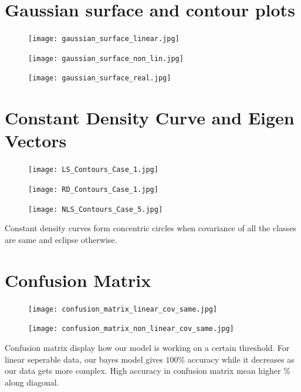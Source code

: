\documentclass[12pt]{article}
\begin{document}
 	\section{Gaussian surface and contour plots}
	\begin{figure}[H]
			\begin{minipage}{0.97\textwidth}
				\centering
				\texttt{[image: gaussian\_surface\_linear.jpg]}
			\end{minipage}\hfill
			\begin{minipage}{0.97\textwidth}
				\centering
				\texttt{[image: gaussian\_surface\_non\_lin.jpg]}
			\end{minipage}
			\begin{minipage}{0.97\textwidth}
				\centering
				\texttt{[image: gaussian\_surface\_real.jpg]}
			\end{minipage}
	\end{figure}\newpage

	\section{Constant Density Curve and Eigen Vectors}
	\begin{figure}[H]
		\begin{minipage}{1.0\textwidth}
			\centering
			\texttt{[image: LS\_Contours\_Case\_1.jpg]}
		\end{minipage}\hfill
		\begin{minipage}{1.0\textwidth}
			\centering
			\texttt{[image: RD\_Contours\_Case\_1.jpg]}
		\end{minipage}
		\begin{minipage}{1.0\textwidth}
			\centering
			\texttt{[image: NLS\_Contours\_Case\_5.jpg]}
		\end{minipage}
		\end{figure}
			Constant density curves form concentric circles when covariance of all the classes are same and eclipse otherwise.	
	\newpage
	
		\section{Confusion Matrix}
	\begin{figure}[H]
		\begin{minipage}{1.0\textwidth}
			\centering
			\texttt{[image: confusion\_matrix\_linear\_cov\_same.jpg]}
		\end{minipage}\hfill
		\begin{minipage}{1.0\textwidth}
			\centering
			\texttt{[image: confusion\_matrix\_non\_linear\_cov\_same.jpg]}
		\end{minipage}
	\end{figure}
	Confusion matrix display how our model is working on a certain threshold. For linear seperable data, our bayes model gives $100\%$ accuracy while it decreases as our data gets more complex. High accuracy in confusion matrix mean higher \% along diagonal.
	\newpage
	
\end{document}
